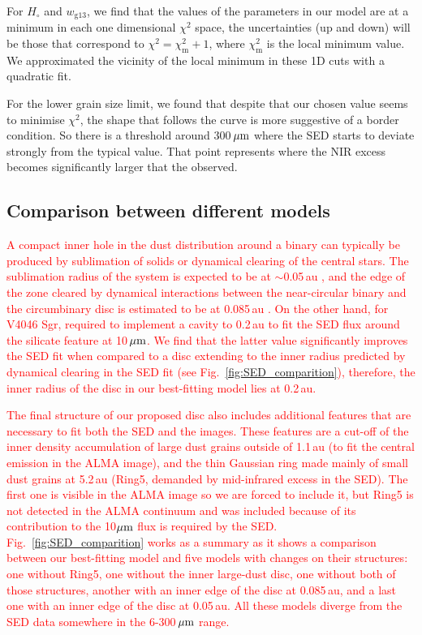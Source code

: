 \documentclass[fleqn,usenatbib,useAMS]{mnras}
\newcommand{\red}[1]{\textcolor{red}{#1}}
\begin{document}
For $H_\circ$ and $w_{\mathrm{g13}}$, we find that the values of the parameters in our model are at a minimum in each one dimensional $\chi^2$ space, the uncertainties (up and down) will be those that correspond to $\chi^2=\chi^2_\mathrm{m}+1$, where $\chi^2_\mathrm{m}$ is the local minimum value. We approximated the vicinity of the local minimum in these 1D cuts with a quadratic fit.

For the lower grain size limit, we found that despite that our chosen value seems to minimise $\chi^2$, the shape that follows the curve is more suggestive of a border condition. So there is a threshold around 300\,$\hbox{$\mu$m}$ where the SED starts to deviate strongly from the typical value. That point represents where the NIR excess becomes significantly larger that the observed.

\subsection{Comparison between different models}\label{sec:A2}

\red{A compact inner hole in the dust distribution around a binary can typically be produced by sublimation of solids or dynamical clearing of the central stars. The sublimation radius of the system is expected to be at $\sim$0.05\,au \citep[$R_{\mathrm{sub}}=0.07\sqrt{L_*(L_{\sun})}$\,au,][]{Francis_2020}, and the edge of the zone cleared by dynamical interactions between the near-circular binary and the circumbinary disc is estimated to be at 0.085\,au \citep[$r=2.08a$,][]{Art_Lu}. On the other hand, for V4046 Sgr, \citet{Jensen_97} required to implement a cavity to 0.2\,au to fit the SED flux around the silicate feature at 10\,$\hbox{$\mu$m}$. We find that the latter value significantly improves the SED fit when compared to a disc extending to the inner radius predicted by dynamical clearing in the SED fit (see Fig.~\ref{fig:SED_comparition}), therefore, the inner radius of the disc in our best-fitting model lies at 0.2\,au.}

\red{The final structure of our proposed disc also includes additional features that are necessary to fit both the SED and the images. These features are a cut-off of the inner density accumulation of large dust grains outside of 1.1\,au (to fit the central emission in the ALMA image), and the thin Gaussian ring made mainly of small dust grains at 5.2\,au (Ring5, demanded by mid-infrared excess in the SED). The first one is visible in the ALMA image so we are forced to include it, but Ring5 is not detected in the ALMA continuum and was included because of its contribution to the 10$\hbox{$\mu$m}$ flux is required by the SED. Fig.~\ref{fig:SED_comparition} works as a summary as it shows a comparison between our best-fitting model and five models with changes on their structures: one without Ring5, one without the inner large-dust disc, one without both of those structures, another with an inner edge of the disc at 0.085\,au, and a last one with an inner edge of the disc at 0.05\,au. All these models diverge from the SED data somewhere in the 6-300\,$\hbox{$\mu$m}$ range.}
\end{document}
